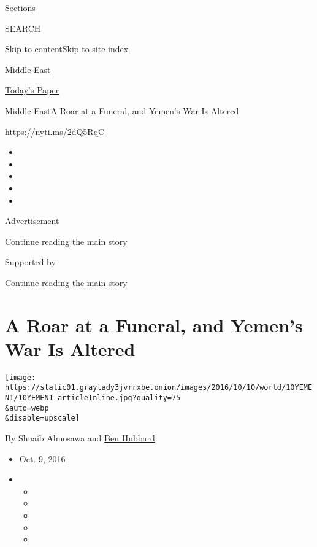 Sections

SEARCH

\protect\hyperlink{site-content}{Skip to
content}\protect\hyperlink{site-index}{Skip to site index}

\href{https://www.nytimes3xbfgragh.onion/section/world/middleeast}{Middle
East}

\href{https://myaccount.nytimes3xbfgragh.onion/auth/login?response_type=cookie\&client_id=vi}{}

\href{https://www.nytimes3xbfgragh.onion/section/todayspaper}{Today's
Paper}

\href{/section/world/middleeast}{Middle East}\textbar{}A Roar at a
Funeral, and Yemen's War Is Altered

\url{https://nyti.ms/2dQ5RqC}

\begin{itemize}
\item
\item
\item
\item
\item
\end{itemize}

Advertisement

\protect\hyperlink{after-top}{Continue reading the main story}

Supported by

\protect\hyperlink{after-sponsor}{Continue reading the main story}

\hypertarget{a-roar-at-a-funeral-and-yemens-war-is-altered}{%
\section{A Roar at a Funeral, and Yemen's War Is
Altered}\label{a-roar-at-a-funeral-and-yemens-war-is-altered}}

\texttt{[image: https://static01.graylady3jvrrxbe.onion/images/2016/10/10/world/10YEMEN1/10YEMEN1-articleInline.jpg?quality=75\\\&auto=webp\\\&disable=upscale]}

By Shuaib Almosawa and
\href{http://www.nytimes3xbfgragh.onion/by/ben-hubbard}{Ben Hubbard}

\begin{itemize}
\item
  Oct. 9, 2016
\item
  \begin{itemize}
  \item
  \item
  \item
  \item
  \item
  \end{itemize}
\end{itemize}

